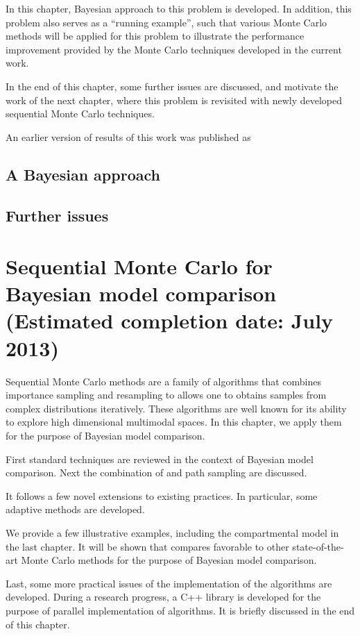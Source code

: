 \documentclass[11pt, bib, fontset = Minion]{marticle}
\def\finish#1{(Estimated completion date: #1 2013)}
\begin{document}
In this chapter, Bayesian approach to this problem is developed. In addition,
this problem also serves as a ``running example'', such that various Monte
Carlo methods will be applied for this problem to illustrate the performance
improvement provided by the Monte Carlo techniques developed in the current
work.

In the end of this chapter, some further issues are discussed, and motivate
the work of the next chapter, where this problem is revisited with newly
developed sequential Monte Carlo techniques.

An earlier version of results of this work was published as \citet{Zhou2013}

\subsection{A Bayesian approach}

\subsection{Further issues}

\section{Sequential Monte Carlo for Bayesian model comparison \finish{July}}

Sequential Monte Carlo methods are a family of algorithms that combines
importance sampling and resampling to allows one to obtains samples from
complex distributions iteratively. These algorithms are well known for its
ability to explore high dimensional multimodal spaces. In this chapter, we
apply them for the purpose of Bayesian model comparison.

First standard techniques are reviewed in the context of Bayesian model
comparison. Next the combination of \smc and path sampling are discussed.

It follows a few novel extensions to existing practices. In particular, some
adaptive methods are developed.

We provide a few illustrative examples, including the \pet compartmental
model in the last chapter. It will be shown that \smc compares favorable to
other state-of-the-art Monte Carlo methods for the purpose of Bayesian model
comparison.

Last, some more practical issues of the implementation of the \smc algorithms
are developed. During a research progress, a C++ library is developed for the
purpose of parallel implementation of \smc algorithms. It is briefly discussed
in the end of this chapter.
\end{document}
